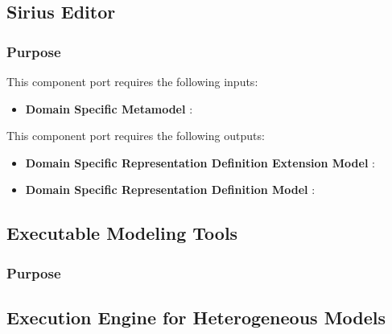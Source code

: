 \documentclass{gemoc} %
\begin{document}
\subsection{Sirius Editor}


\subsubsection{Purpose}

This component port requires the following inputs:
\begin{itemize}
  \item \textbf{Domain Specific Metamodel} :
\end{itemize}

This component port requires the following outputs:
\begin{itemize}
  \item \textbf{Domain Specific Representation Definition Extension Model} :
  \item \textbf{Domain Specific  Representation Definition Model} :
\end{itemize}

\subsection{Executable Modeling Tools}


\subsubsection{Purpose}



\subsection{Execution Engine for Heterogeneous Models}
\end{document}
